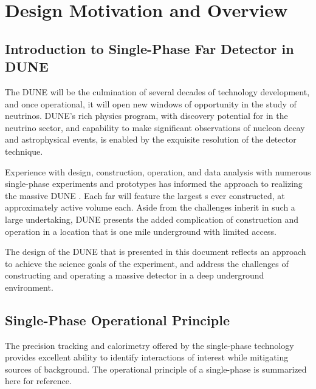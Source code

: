 \chapter{Design Motivation and Overview}
\label{ch:fdsp-apa-design}

\section{Introduction to Single-Phase Far Detector in DUNE}
\label{sec:fdsp-design-intro}

The DUNE  will be the culmination of several decades
of \lartpc technology development, and once operational, it will open new windows of opportunity in the study
of neutrinos.  DUNE's rich physics program, with discovery
potential for  in the neutrino sector, and capability to make
significant observations of nucleon decay and astrophysical events, is enabled
by the exquisite resolution of the \lartpc detector technique.

Experience with design, construction, operation, and data
analysis with numerous single-phase \lartpc experiments and prototypes has informed the approach to
realizing the massive DUNE . Each far  will feature the largest \lartpc{}s ever
constructed, at approximately \nominalmodsize active volume each.  Aside from the
challenges inherit in such a large undertaking, DUNE presents the added complication of construction and operation in a location
that is one mile underground with limited access.

The design of the DUNE  that is presented in this document
reflects an approach to achieve the science goals of the experiment, and
address the challenges of constructing and operating a massive detector in a deep
underground environment.


\section{Single-Phase \lartpc Operational Principle}
\label{sec:fdsp-design-op}

The precision tracking and calorimetry offered by the single-phase \lartpc
technology provides excellent ability to identify interactions of interest
while mitigating sources of background.  The operational principle of a
single-phase \lartpc is summarized here for reference.

